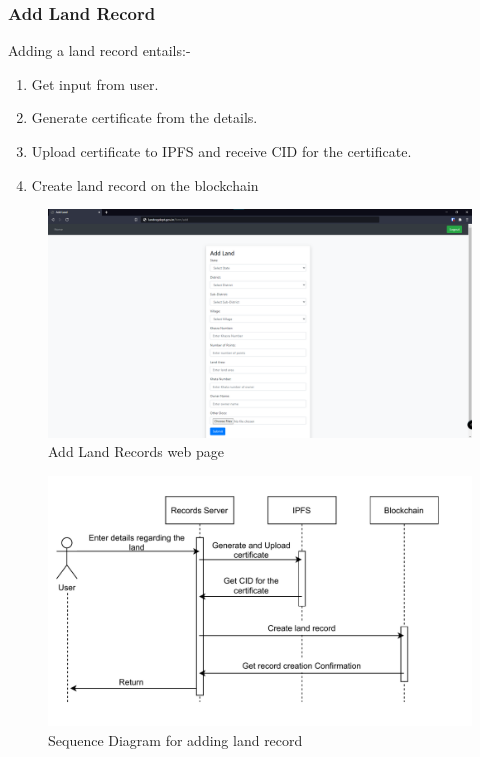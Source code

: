 \documentclass{article}
\begin{document}
        

        \subsubsection{Add Land Record}
            Adding a land record entails:-
            \begin{enumerate}
                \item Get input from user.
                \item Generate certificate from the details.
                \item Upload certificate to IPFS and receive CID for the certificate.
                \item Create land record on the blockchain
            \end{enumerate}

            \begin{figure}[htbp]
                \includegraphics[scale=0.25]{records_add}
                \centering
                \caption{Add Land Records web page}
            \end{figure}
            \begin{figure}[htbp]
                \includegraphics[scale=0.25]{records_seq_add}
                \centering
                \caption{Sequence Diagram for adding land record}
            \end{figure}
        
\end{document}
